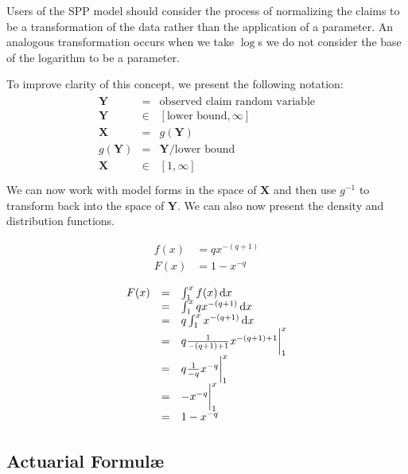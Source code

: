 \documentclass[]{article} %
\begin{document}
Users of the SPP model should consider the process of normalizing the claims to be a transformation of the data rather than the application of a parameter. An analogous transformation occurs when we take $\log$s we do not consider the base of the logarithm to be a parameter.

To improve clarity of this concept, we present the following notation:
\begin{eqnarray}
	\begin{array}{ccl}
		\mathbf{Y} & = & \text{observed claim random variable} \\ 
		\mathbf{Y}& \in &  [\text{lower bound}, \infty]\\	
		\mathbf{X} & =  & g(\mathbf{Y})\\
		g(\mathbf{Y}) & =  & \mathbf{Y}/\text{lower bound}\\
		\mathbf{X}& \in &  [1, \infty]\\
	\end{array} 
\end{eqnarray}
We can now work with model forms in the space of $\mathbf{X}$ and then use $g^{-1}$ to transform back into the space of $\mathbf{Y}$. We can also now present the density and distribution functions.

\begin{align}
		f(x) & =  qx^{-(q+1)}\\
		F(x) & =  1 - x^{-q}
\end{align}

\begin{eqnarray}
\begin{array}{ccl}
	F(x) & = &\int_{1}^{x} f(x) \operatorname{d \!} x \\	
		& = &\int_{1}^{x}qx^{-(q+1)} \operatorname{d \!} x\\
		& = &q \int_{1}^{x}x^{-(q+1)} \operatorname{d \!} x\\
		& = &q \frac{1}{-(q+1)+1} x^{-(q+1)+1} \bigg|_{1}^{x}\\
		& = &q \frac{1}{-q} x^{-q} \bigg|_{1}^{x}\\
		& = & - x^{-q}\bigg|_{1}^{x}\\
		& = & 1 - x^{-q}
\end{array}
\end{eqnarray}

\subsection{Actuarial Formul\ae}


\end{document}
